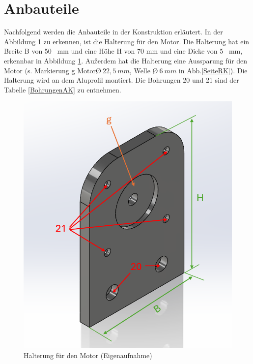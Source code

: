 \section{Anbauteile}

Nachfolgend werden die Anbauteile in der Konstruktion erläutert. 
In der Abbildung \ref{FlankeMotorK} zu erkennen, ist die Halterung für den Motor. Die Halterung hat ein Breite B von 50 \ mm und eine Höhe H von 70 mm und eine Dicke von 5 \ mm, erkennbar in Abbildung \ref{FlankeMotorK}. Außerdem hat die Halterung eine Aussparung für den Motor (s. Markierung g Motor\O $ \ 22,5 \ mm$, Welle \O $ \ 6 \ mm$  in Abb.\ref{SeiteRK}). Die Halterung wird an dem Aluprofil montiert. Die Bohrungen 20 und 21 sind der Tabelle \ref{BohrungenAK} zu entnehmen. 
 
\begin{figure}[H]
	\begin{center}
		\includegraphics[width=\textwidth]{Images/Konstruktion/FlankeMotorK.png}
		\caption{Halterung für den Motor (Eigenaufnahme)} \label{FlankeMotorK}
	\end{center}
\end{figure}
 
